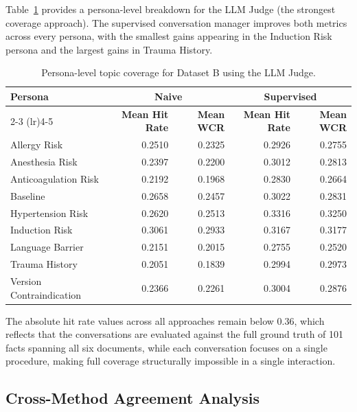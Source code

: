 Table~\ref{tab:coverage_persona_breakdown} provides a persona-level breakdown for the LLM Judge (the strongest coverage approach). 
The supervised conversation manager improves both metrics across every persona, with the smallest gains appearing in the Induction Risk persona and the largest gains in Trauma History.

\begin{table}[htbp]
	\centering
	\caption{Persona-level topic coverage for Dataset B using the LLM Judge.}
	\label{tab:coverage_persona_breakdown}
	\begin{tabular}{lrrrr}
		\toprule
		\textbf{Persona} & \multicolumn{2}{c}{\textbf{Naive}} & \multicolumn{2}{c}{\textbf{Supervised}} \\
		\cmidrule(lr){2-3} \cmidrule(lr){4-5}
		& \textbf{Mean Hit Rate} & \textbf{Mean WCR} & \textbf{Mean Hit Rate} & \textbf{Mean WCR} \\
		\midrule
		Allergy Risk            & 0.2510 & 0.2325 & 0.2926 & 0.2755 \\
		Anesthesia Risk         & 0.2397 & 0.2200 & 0.3012 & 0.2813 \\
		Anticoagulation Risk    & 0.2192 & 0.1968 & 0.2830 & 0.2664 \\
		Baseline                & 0.2658 & 0.2457 & 0.3022 & 0.2831 \\
		Hypertension Risk       & 0.2620 & 0.2513 & 0.3316 & 0.3250 \\
		Induction Risk          & 0.3061 & 0.2933 & 0.3167 & 0.3177 \\
		Language Barrier        & 0.2151 & 0.2015 & 0.2755 & 0.2520 \\
		Trauma History          & 0.2051 & 0.1839 & 0.2994 & 0.2973 \\
		Version Contraindication & 0.2366 & 0.2261 & 0.3004 & 0.2876 \\
		\bottomrule
	\end{tabular}
\end{table}

The absolute hit rate values across all approaches remain below 0.36, which reflects that the conversations are evaluated against the full ground truth of 101 facts spanning all six documents, while each conversation focuses on a single procedure, making full coverage structurally impossible in a single interaction.

\subsection{Cross-Method Agreement Analysis}

